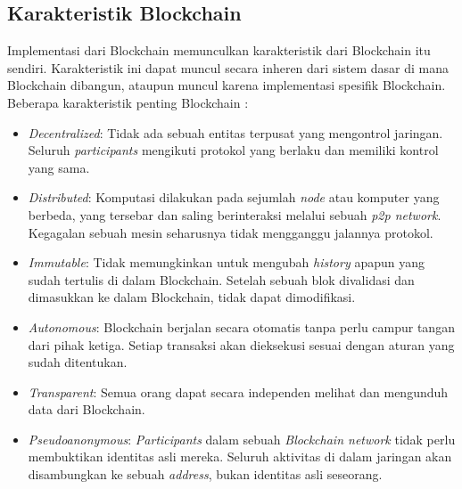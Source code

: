\subsection{Karakteristik Blockchain}
\label{subsec:karakteristik-blockchain}

Implementasi dari Blockchain memunculkan karakteristik dari Blockchain itu sendiri. Karakteristik ini dapat muncul secara inheren dari sistem dasar di mana Blockchain dibangun, ataupun muncul karena implementasi spesifik Blockchain. Beberapa karakteristik penting Blockchain \parencite{aimar2023extraction}:

\begin{itemize}
	\item \textit{Decentralized}: Tidak ada sebuah entitas terpusat yang mengontrol jaringan. Seluruh \textit{participants} mengikuti protokol yang berlaku dan memiliki kontrol yang sama.
	\item \textit{Distributed}: Komputasi dilakukan pada sejumlah \textit{node} atau komputer yang berbeda, yang tersebar dan saling berinteraksi melalui sebuah \textit{p2p network}. Kegagalan sebuah mesin seharusnya tidak mengganggu jalannya protokol.
	\item \textit{Immutable}: Tidak memungkinkan untuk mengubah \textit{history} apapun yang sudah tertulis di dalam Blockchain. Setelah sebuah blok divalidasi dan dimasukkan ke dalam Blockchain, tidak dapat dimodifikasi.
	\item \textit{Autonomous}: Blockchain berjalan secara otomatis tanpa perlu campur tangan dari pihak ketiga. Setiap transaksi akan dieksekusi sesuai dengan aturan yang sudah ditentukan.
	\item \textit{Transparent}: Semua orang dapat secara independen melihat dan mengunduh data dari Blockchain.
	\item \textit{Pseudoanonymous}: \textit{Participants} dalam sebuah \textit{Blockchain network} tidak perlu membuktikan identitas asli mereka. Seluruh aktivitas di dalam jaringan akan disambungkan ke sebuah \textit{address}, bukan identitas asli seseorang.
\end{itemize}